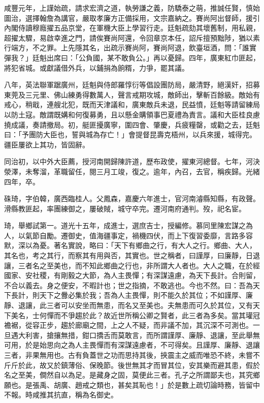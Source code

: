 \begin{pinyinscope}
咸豐元年，上謹始疏，請求宏濟之道，執勞謙之義，防驕泰之萌，推誠任賢，慎始圖治，選擇翰詹為講官，嚴取孝廉方正備採用，文宗嘉納之。賽尚阿出督師，援引內閣侍讀穆廕擢五品京堂，在軍機大臣上學習行走。廷魁疏劾其壞舊制，用私親，超擢太驟，易啟幸進之門，請俟賽尚阿還，令回章京本任，詔斥擅預黜陟，猶以素行端方，不之罪。上先隱其名，出疏示賽尚阿，賽尚阿退，飲臺垣酒，問：「誰實彈我？」廷魁出席曰：「公負國，某不敢負公。」再以憂歸。四年，廣東紅巾匪起，將犯省城。或獻議借外兵，以鋪捐為餉糈，力爭，罷其議。

八年，英法聯軍踞廣州，廷魁與侍郎羅惇衍等倡設團防局，嚴清野，絕漢奸，招募東莞及三元里、佛山練勇得數萬人，聲言戒期攻城，敵師出，擊斬百餘級。敵始有戒心，稍戢，連艘北犯，既而天津議和，廣東敵兵未退，民益憤，廷魁等請留練局以防土寇。敵謂既媾和何復募勇，且以懸金購領事巴夏禮為責言。議和大臣桂良慮撓成議，奏請撤局。初，艇匪擾廣寧，圍四會、肇慶，兵疲糧罄，或勸之去，廷魁曰：「予團防大臣也，誓與城為存亡！」會提督昆壽克梧州，以兵來援，城得完。疆臣屢欲上其功，皆固辭。

同治初，以中外大臣薦，授河南開歸陳許道，歷布政使，擢東河總督。七年，河決滎澤，未奪溜，革職留任，閱三月工竣，復之。逾年，內召，去官，稱疾歸。光緒四年，卒。

硃琦，字伯韓，廣西臨桂人。父鳳森，嘉慶六年進士，官河南濬縣知縣，有政聲。滑縣教匪起，率團練御之，屢破賊，城守卒完。遷河南府通判。歿，祀名宦。

琦，舉鄉試第一。道光十五年，成進士，選庶吉士，授編修。慕同里陳宏謀之為人，以氣節自勵。遷御史，值海疆事定，禍機四伏，而上下復習委靡，言路多容默，深以為憂。著名實說，略曰：「天下有鄉曲之行，有大人之行。鄉曲、大人，其名也，考之其行，而察其有用與否，其實也。世之稱者，曰謹厚，曰廉靜，日退讓，三者名之至美也，而不知此鄉曲之行也，非所謂大人者也。大人之職，在於經國家、安社稷，有剛毅之大節，為人主畏憚；有深謀遠慮，為天下長計。合則留，不合以義去。身之便安，不暇計也；世之指摘，不敢逃也。今也不然。曰：吾為天下長計，則天下之釁必集於我；吾為人主畏憚，則不能久於其位；不如謹厚、廉靜、退讓，此三者可以安坐而無患，而名又至美也。夫無患而可久於其位，又有天下美名，士何憚而不爭趨於此？故近世所稱公卿之賢者，此三者為多矣。當其瓘冠襜裾，從容正步，趨於廊廟之間，上之人不疑，而非議不加，其沉深不可測也。一旦遇大利害，搶攘無措，鉗口撟舌而莫敢言，而所謂謹厚、廉靜、退讓，至此舉無可用，於是始思向之為人主畏憚而有深謀遠慮者，不可得矣。且謹厚、廉靜、退讓三者，非果無用也。古有負蓋世之功而思持其後，挾震主之威而唯恐不終，未嘗不斤斤於此，故又於鎮薄俗、保晚節。後世無其才而冒其位，安其樂而避其患，假於名之至美，僴然自以為足。是藏身之固，莫便此三者。孔子之所謂鄙夫也，其究鄉願也。是張禹、胡廣、趙戒之類也，甚矣其恥也！」於是數上疏切論時務，皆留中不報。時咸推其抗直，稱為名御史。


\end{pinyinscope}
